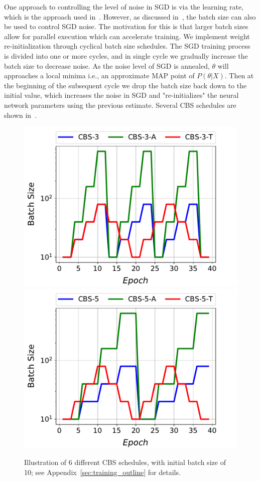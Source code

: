 One approach to controlling the level of noise in SGD is via the learning rate, which is the approach used 
in~\cite{huang2017snapshot,smith2017cyclical}. However, as
discussed in~\cite{jastrzkebski2017three,smith2017don,devarakonda2017adabatch}, the batch size can also be used to control SGD noise. The motivation
for this is that larger batch sizes allow for parallel execution
which can accelerate training. 
We implement weight re-initialization through cyclical batch size schedules. 
The SGD training process is divided into one or more cycles, and in single cycle we gradually increase the batch size to decrease noise. As the noise level of SGD is annealed, $\theta$ will approaches a 
 local minima i.e., an approximate MAP point of $P(\theta| X)$.
Then at the beginning of the subsequent cycle we drop the batch size back down to the initial value, which increases the noise in SGD and "re-initializes" the neural network parameters using the previous estimate. Several CBS schedules are shown in~.

\begin{figure}[!htbp]
 \centering
\includegraphics[width=.4\textwidth]{fig/cbs_3_cartoon.pdf}
\includegraphics[width=.4\textwidth]{fig/cbs_5_cartoon.pdf}
 \caption{\footnotesize Illustration of 6 different CBS schedules, with initial batch size of 10; see Appendix~\ref{sec:training_outline} for details.} 
 \label{fig:cbs_cartoon}
\end{figure}
